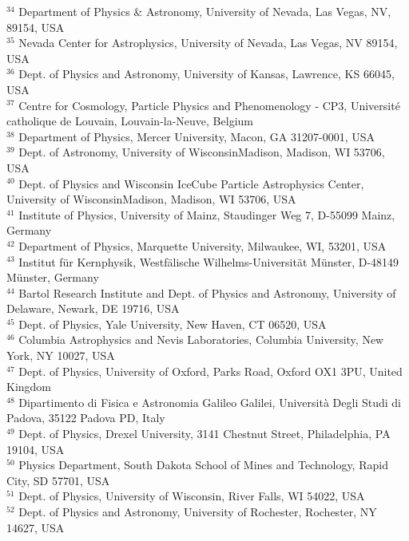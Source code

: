 $^{34}$ Department of Physics {\&} Astronomy, University of Nevada, Las Vegas, NV, 89154, USA \\
$^{35}$ Nevada Center for Astrophysics, University of Nevada, Las Vegas, NV 89154, USA \\
$^{36}$ Dept. of Physics and Astronomy, University of Kansas, Lawrence, KS 66045, USA \\
$^{37}$ Centre for Cosmology, Particle Physics and Phenomenology - CP3, Universit{\'e} catholique de Louvain, Louvain-la-Neuve, Belgium \\
$^{38}$ Department of Physics, Mercer University, Macon, GA 31207-0001, USA \\
$^{39}$ Dept. of Astronomy, University of Wisconsin{\textendash}Madison, Madison, WI 53706, USA \\
$^{40}$ Dept. of Physics and Wisconsin IceCube Particle Astrophysics Center, University of Wisconsin{\textendash}Madison, Madison, WI 53706, USA \\
$^{41}$ Institute of Physics, University of Mainz, Staudinger Weg 7, D-55099 Mainz, Germany \\
$^{42}$ Department of Physics, Marquette University, Milwaukee, WI, 53201, USA \\
$^{43}$ Institut f{\"u}r Kernphysik, Westf{\"a}lische Wilhelms-Universit{\"a}t M{\"u}nster, D-48149 M{\"u}nster, Germany \\
$^{44}$ Bartol Research Institute and Dept. of Physics and Astronomy, University of Delaware, Newark, DE 19716, USA \\
$^{45}$ Dept. of Physics, Yale University, New Haven, CT 06520, USA \\
$^{46}$ Columbia Astrophysics and Nevis Laboratories, Columbia University, New York, NY 10027, USA \\
$^{47}$ Dept. of Physics, University of Oxford, Parks Road, Oxford OX1 3PU, United Kingdom\\
$^{48}$ Dipartimento di Fisica e Astronomia Galileo Galilei, Universit{\`a} Degli Studi di Padova, 35122 Padova PD, Italy \\
$^{49}$ Dept. of Physics, Drexel University, 3141 Chestnut Street, Philadelphia, PA 19104, USA \\
$^{50}$ Physics Department, South Dakota School of Mines and Technology, Rapid City, SD 57701, USA \\
$^{51}$ Dept. of Physics, University of Wisconsin, River Falls, WI 54022, USA \\
$^{52}$ Dept. of Physics and Astronomy, University of Rochester, Rochester, NY 14627, USA \\
